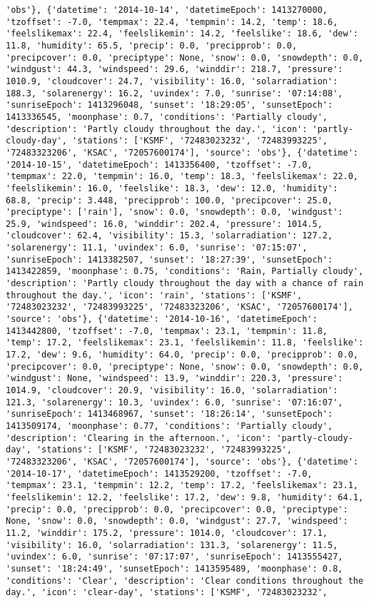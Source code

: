 \documentclass[
  letterpaper,
  DIV=11,
  numbers=noendperiod]{scrartcl}
\begin{document}
\begin{verbatim}
'obs'}, {'datetime': '2014-10-14', 'datetimeEpoch': 1413270000, 'tzoffset': -7.0, 'tempmax': 22.4, 'tempmin': 14.2, 'temp': 18.6, 'feelslikemax': 22.4, 'feelslikemin': 14.2, 'feelslike': 18.6, 'dew': 11.8, 'humidity': 65.5, 'precip': 0.0, 'precipprob': 0.0, 'precipcover': 0.0, 'preciptype': None, 'snow': 0.0, 'snowdepth': 0.0, 'windgust': 44.3, 'windspeed': 29.6, 'winddir': 218.7, 'pressure': 1010.9, 'cloudcover': 24.7, 'visibility': 16.0, 'solarradiation': 188.3, 'solarenergy': 16.2, 'uvindex': 7.0, 'sunrise': '07:14:08', 'sunriseEpoch': 1413296048, 'sunset': '18:29:05', 'sunsetEpoch': 1413336545, 'moonphase': 0.7, 'conditions': 'Partially cloudy', 'description': 'Partly cloudy throughout the day.', 'icon': 'partly-cloudy-day', 'stations': ['KSMF', '72483023232', '72483993225', '72483323206', 'KSAC', '72057600174'], 'source': 'obs'}, {'datetime': '2014-10-15', 'datetimeEpoch': 1413356400, 'tzoffset': -7.0, 'tempmax': 22.0, 'tempmin': 16.0, 'temp': 18.3, 'feelslikemax': 22.0, 'feelslikemin': 16.0, 'feelslike': 18.3, 'dew': 12.0, 'humidity': 68.8, 'precip': 3.448, 'precipprob': 100.0, 'precipcover': 25.0, 'preciptype': ['rain'], 'snow': 0.0, 'snowdepth': 0.0, 'windgust': 25.9, 'windspeed': 16.0, 'winddir': 202.4, 'pressure': 1014.5, 'cloudcover': 62.4, 'visibility': 15.3, 'solarradiation': 127.2, 'solarenergy': 11.1, 'uvindex': 6.0, 'sunrise': '07:15:07', 'sunriseEpoch': 1413382507, 'sunset': '18:27:39', 'sunsetEpoch': 1413422859, 'moonphase': 0.75, 'conditions': 'Rain, Partially cloudy', 'description': 'Partly cloudy throughout the day with a chance of rain throughout the day.', 'icon': 'rain', 'stations': ['KSMF', '72483023232', '72483993225', '72483323206', 'KSAC', '72057600174'], 'source': 'obs'}, {'datetime': '2014-10-16', 'datetimeEpoch': 1413442800, 'tzoffset': -7.0, 'tempmax': 23.1, 'tempmin': 11.8, 'temp': 17.2, 'feelslikemax': 23.1, 'feelslikemin': 11.8, 'feelslike': 17.2, 'dew': 9.6, 'humidity': 64.0, 'precip': 0.0, 'precipprob': 0.0, 'precipcover': 0.0, 'preciptype': None, 'snow': 0.0, 'snowdepth': 0.0, 'windgust': None, 'windspeed': 13.9, 'winddir': 220.3, 'pressure': 1014.9, 'cloudcover': 20.9, 'visibility': 16.0, 'solarradiation': 121.3, 'solarenergy': 10.3, 'uvindex': 6.0, 'sunrise': '07:16:07', 'sunriseEpoch': 1413468967, 'sunset': '18:26:14', 'sunsetEpoch': 1413509174, 'moonphase': 0.77, 'conditions': 'Partially cloudy', 'description': 'Clearing in the afternoon.', 'icon': 'partly-cloudy-day', 'stations': ['KSMF', '72483023232', '72483993225', '72483323206', 'KSAC', '72057600174'], 'source': 'obs'}, {'datetime': '2014-10-17', 'datetimeEpoch': 1413529200, 'tzoffset': -7.0, 'tempmax': 23.1, 'tempmin': 12.2, 'temp': 17.2, 'feelslikemax': 23.1, 'feelslikemin': 12.2, 'feelslike': 17.2, 'dew': 9.8, 'humidity': 64.1, 'precip': 0.0, 'precipprob': 0.0, 'precipcover': 0.0, 'preciptype': None, 'snow': 0.0, 'snowdepth': 0.0, 'windgust': 27.7, 'windspeed': 11.2, 'winddir': 175.2, 'pressure': 1014.0, 'cloudcover': 17.1, 'visibility': 16.0, 'solarradiation': 131.3, 'solarenergy': 11.5, 'uvindex': 6.0, 'sunrise': '07:17:07', 'sunriseEpoch': 1413555427, 'sunset': '18:24:49', 'sunsetEpoch': 1413595489, 'moonphase': 0.8, 'conditions': 'Clear', 'description': 'Clear conditions throughout the day.', 'icon': 'clear-day', 'stations': ['KSMF', '72483023232', 
\end{verbatim}
\end{document}

